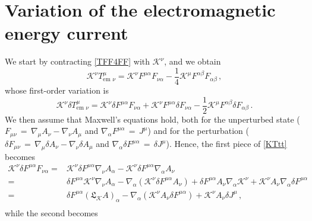 \documentclass[a4paper, amsfonts, amssymb, amsmath, reprint, showkeys, nofootinbib, twoside, onecolumn,notitlepage]{revtex4-1}
\newcommand{\K}{{\mathcal{K}}}
\theoremstyle{definition}
\theoremstyle{theorem}
\begin{document}
\vspace{-0.2cm}
\section{Variation of the electromagnetic energy current}\label{apppBBB}
\vspace{-0.2cm}

We start by contracting \eqref{TFF4FF} with $\K^\nu$, and we obtain
\begin{equation}
 \K^\nu T^{\mu }_{\text{em }\nu}= \K^{\nu} F^{\mu \alpha} F_{\nu \alpha} -\dfrac{1}{4} \K^{\mu} F^{\alpha \beta}F_{\alpha \beta} \, ,   
\end{equation}
whose first-order variation is
\begin{equation}\label{KTtt}
\K^\nu \delta  T^{\mu }_{\text{em }\nu}= \K^{\nu} \delta F^{\mu \alpha} F_{\nu \alpha}+ \K^{\nu} F^{\mu \alpha} \delta F_{\nu \alpha} -\dfrac{1}{2} \K^{\mu} F^{\alpha \beta}\delta F_{\alpha \beta} \, .
\end{equation}
We then assume that Maxwell's equations hold, both for the unperturbed state
($F_{\mu \nu}\,{=}\,\nabla_\mu A_\nu{-}\nabla_\nu A_\mu$ and  $\nabla_\alpha F^{\mu \alpha}\,{=}\,J^\mu$) and for the perturbation ($\delta F_{\mu \nu}\,{=}\,\nabla_\mu \delta A_\nu{-}\nabla_\nu \delta A_\mu$ and  $\nabla_\alpha \delta F^{\mu \alpha}\,{=}\,\delta J^\mu$). Hence, the first piece of \eqref{KTtt} becomes
\begin{equation}
\begin{split}
\K^{\nu} \delta F^{\mu \alpha} F_{\nu \alpha} ={}& \K^{\nu} \delta F^{\mu \alpha} \nabla_\nu A_\alpha - \K^{\nu} \delta F^{\mu \alpha}\nabla_\alpha A_\nu \\
={}&  \delta F^{\mu \alpha} \K^{\nu} \nabla_\nu A_\alpha - \nabla_\alpha(\K^{\nu} \delta F^{\mu \alpha} A_\nu)+\delta F^{\mu \alpha} A_\nu \nabla_\alpha \K^{\nu}+\K^{ \nu}A_\nu \nabla_\alpha \delta F^{\mu \alpha} \\ 
={}&  \delta F^{\mu \alpha} (\mathfrak{L}_{\K} A)_\alpha - \nabla_\alpha(\K^{\nu} A_\nu \delta F^{\mu \alpha} )+ \K^{ \nu}A_\nu \delta J^\mu \, , \\ 
\end{split}
\end{equation}
while the second becomes
\end{document}
